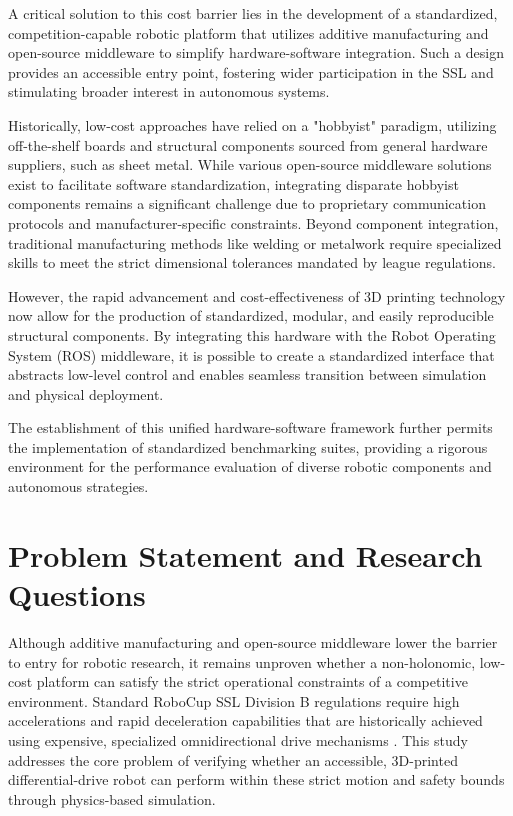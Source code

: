 \documentclass[a4paper,twoside,12pt]{report}
\begin{document}
A critical solution to this cost barrier lies in the development of a standardized, competition-capable robotic platform that utilizes additive manufacturing and open-source middleware to simplify hardware-software integration. Such a design provides an accessible entry point, fostering wider participation in the SSL and stimulating broader interest in autonomous systems.

Historically, low-cost approaches have relied on a "hobbyist" paradigm, utilizing off-the-shelf boards and structural components sourced from general hardware suppliers, such as sheet metal. While various open-source middleware solutions exist to facilitate software standardization, integrating disparate hobbyist components remains a significant challenge due to proprietary communication protocols and manufacturer-specific constraints. Beyond component integration, traditional manufacturing methods like welding or metalwork require specialized skills to meet the strict dimensional tolerances mandated by league regulations.

However, the rapid advancement and cost-effectiveness of 3D printing technology now allow for the production of standardized, modular, and easily reproducible structural components. By integrating this hardware with the Robot Operating System (ROS) middleware, it is possible to create a standardized interface that abstracts low-level control and enables seamless transition between simulation and physical deployment.

The establishment of this unified hardware-software framework further permits the implementation of standardized benchmarking suites, providing a rigorous environment for the performance evaluation of diverse robotic components and autonomous strategies.

\section{Problem Statement and Research Questions}

Although additive manufacturing and open-source middleware lower the barrier to entry for robotic research, it remains unproven whether a non-holonomic, low-cost platform can satisfy the strict operational constraints of a competitive environment. Standard RoboCup SSL Division B regulations require high accelerations and rapid deceleration capabilities that are historically achieved using expensive, specialized omnidirectional drive mechanisms \citep{ateam2023tdp}. This study addresses the core problem of verifying whether an accessible, 3D-printed differential-drive robot can perform within these strict motion and safety bounds through physics-based simulation.
\end{document}
